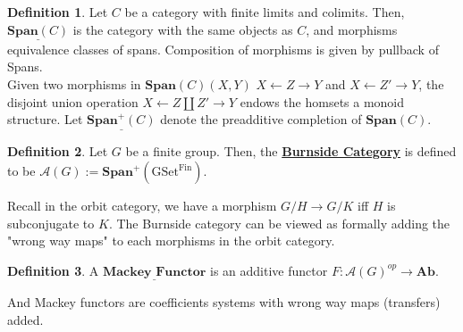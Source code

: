 \documentclass{article}
\theoremstyle{definition}
\theoremstyle{definition}
\newtheorem{definition}{Definition}[theorem]
\theoremstyle{definition}
\theoremstyle{definition}
\theoremstyle{definition}
\theoremstyle{definition}
\theoremstyle{definition}
\begin{document}
\begin{tcolorbox}[colback=purple!5!white,colframe=purple!75!black]
\begin{definition}
Let $C$ be a category with finite limits and colimits. Then, $\underline{\textbf{Span}(C)}$ is the category with the same objects as $C$, and morphisms equivalence classes of spans. Composition of morphisms is given by pullback of Spans.\\

Given two morphisms in $\textbf{Span}(C)(X,Y)$ $X\leftarrow Z\rightarrow Y$ and $X\leftarrow Z'\rightarrow Y$, the disjoint union operation $X\leftarrow Z\coprod Z'\rightarrow Y$ endows the homsets a monoid structure. Let $\underline{\textbf{Span}^+(C)}$ denote the preadditive completion of $\textbf{Span}(C)$. 
\end{definition}
\end{tcolorbox}



\begin{tcolorbox}[colback=purple!5!white,colframe=purple!75!black]
\begin{definition}
Let $G$ be a finite group. Then, the \underline{\textbf{Burnside Category}} is defined to be $\mathcal{A}(G):=\textbf{Span}^+(\textrm{GSet}^{\textrm{Fin}})$.
\end{definition}
\end{tcolorbox}
Recall in the orbit category, we have a morphism $G/H\to G/K$ iff $H$ is subconjugate to $K$. The Burnside category can be viewed as formally adding the "wrong way maps" to each morphisms in the orbit category. 

\begin{tcolorbox}[colback=purple!5!white,colframe=purple!75!black]
\begin{definition}
A $\underline{\textbf{Mackey Functor}}$ is an additive functor $F: \mathcal{A}(G)^{op}\to \textbf{Ab}$. 
\end{definition}
\end{tcolorbox}
And Mackey functors are coefficients systems with wrong way maps (transfers) added. 
\end{document}
